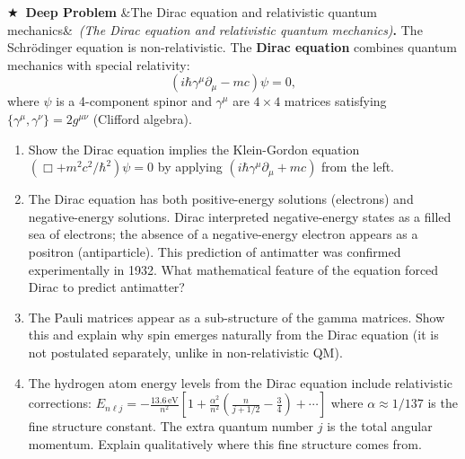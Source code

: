 \documentclass[12pt,a4paper]{article}
\newcounter{problem}
\newcounter{deepproblem}
\newenvironment{deepproblem}[1][]{\refstepcounter{deepproblem}\par\vspace{6pt}\noindent\textbf{\color{NavyBlue}$\bigstar$\ Deep Problem \thedeepproblem}\ifx&#1&\else\ \textit{(#1)}\fi\textbf{.}\enskip}{\par\vspace{4pt}}
\begin{document}
\begin{deepproblem}[The Dirac equation and relativistic quantum mechanics]
The Schr\"{o}dinger equation is non-relativistic. The \textbf{Dirac equation} combines quantum mechanics with special relativity:
\[
  (i\hbar\gamma^\mu\partial_\mu - mc)\psi = 0,
\]
where $\psi$ is a 4-component spinor and $\gamma^\mu$ are $4\times 4$ matrices satisfying $\{\gamma^\mu,\gamma^\nu\}=2g^{\mu\nu}$ (Clifford algebra).
\begin{enumerate}[label=(\alph*)]
  \item Show the Dirac equation implies the Klein-Gordon equation $(\Box + m^2c^2/\hbar^2)\psi=0$ by applying $(i\hbar\gamma^\mu\partial_\mu+mc)$ from the left.
  \item The Dirac equation has both positive-energy solutions (electrons) and negative-energy solutions. Dirac interpreted negative-energy states as a filled sea of electrons; the absence of a negative-energy electron appears as a positron (antiparticle). This prediction of antimatter was confirmed experimentally in 1932. What mathematical feature of the equation forced Dirac to predict antimatter?
  \item The Pauli matrices appear as a sub-structure of the gamma matrices. Show this and explain why spin emerges naturally from the Dirac equation (it is not postulated separately, unlike in non-relativistic QM).
  \item The hydrogen atom energy levels from the Dirac equation include relativistic corrections: $E_{n\ell j} = -\frac{13.6\,\text{eV}}{n^2}\left[1+\frac{\alpha^2}{n^2}\left(\frac{n}{j+1/2}-\frac{3}{4}\right)+\cdots\right]$ where $\alpha\approx1/137$ is the fine structure constant. The extra quantum number $j$ is the total angular momentum. Explain qualitatively where this fine structure comes from.
\end{enumerate}
\end{deepproblem}
\end{document}
